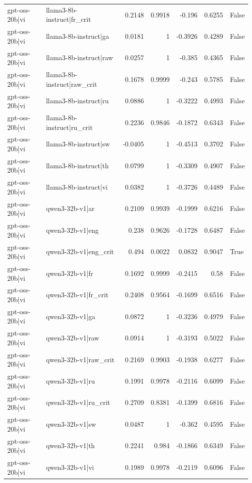 \begin{table}
\begin{tabular}{l l r r r r l}
gpt-oss-20b|vi & llama3-8b-instruct|fr_crit & 0.2148 & 0.9918 & -0.196 & 0.6255 & False \\
gpt-oss-20b|vi & llama3-8b-instruct|ga & 0.0181 & 1 & -0.3926 & 0.4289 & False \\
gpt-oss-20b|vi & llama3-8b-instruct|raw & 0.0257 & 1 & -0.385 & 0.4365 & False \\
gpt-oss-20b|vi & llama3-8b-instruct|raw_crit & 0.1678 & 0.9999 & -0.243 & 0.5785 & False \\
gpt-oss-20b|vi & llama3-8b-instruct|ru & 0.0886 & 1 & -0.3222 & 0.4993 & False \\
gpt-oss-20b|vi & llama3-8b-instruct|ru_crit & 0.2236 & 0.9846 & -0.1872 & 0.6343 & False \\
gpt-oss-20b|vi & llama3-8b-instruct|sw & -0.0405 & 1 & -0.4513 & 0.3702 & False \\
gpt-oss-20b|vi & llama3-8b-instruct|th & 0.0799 & 1 & -0.3309 & 0.4907 & False \\
gpt-oss-20b|vi & llama3-8b-instruct|vi & 0.0382 & 1 & -0.3726 & 0.4489 & False \\
gpt-oss-20b|vi & qwen3-32b-v1|ar & 0.2109 & 0.9939 & -0.1999 & 0.6216 & False \\
gpt-oss-20b|vi & qwen3-32b-v1|eng & 0.238 & 0.9626 & -0.1728 & 0.6487 & False \\
gpt-oss-20b|vi & qwen3-32b-v1|eng_crit & 0.494 & 0.0022 & 0.0832 & 0.9047 & True \\
gpt-oss-20b|vi & qwen3-32b-v1|fr & 0.1692 & 0.9999 & -0.2415 & 0.58 & False \\
gpt-oss-20b|vi & qwen3-32b-v1|fr_crit & 0.2408 & 0.9564 & -0.1699 & 0.6516 & False \\
gpt-oss-20b|vi & qwen3-32b-v1|ga & 0.0872 & 1 & -0.3236 & 0.4979 & False \\
gpt-oss-20b|vi & qwen3-32b-v1|raw & 0.0914 & 1 & -0.3193 & 0.5022 & False \\
gpt-oss-20b|vi & qwen3-32b-v1|raw_crit & 0.2169 & 0.9903 & -0.1938 & 0.6277 & False \\
gpt-oss-20b|vi & qwen3-32b-v1|ru & 0.1991 & 0.9978 & -0.2116 & 0.6099 & False \\
gpt-oss-20b|vi & qwen3-32b-v1|ru_crit & 0.2709 & 0.8381 & -0.1399 & 0.6816 & False \\
gpt-oss-20b|vi & qwen3-32b-v1|sw & 0.0487 & 1 & -0.362 & 0.4595 & False \\
gpt-oss-20b|vi & qwen3-32b-v1|th & 0.2241 & 0.984 & -0.1866 & 0.6349 & False \\
gpt-oss-20b|vi & qwen3-32b-v1|vi & 0.1989 & 0.9978 & -0.2119 & 0.6096 & False \\

\end{tabular}
\end{table}
